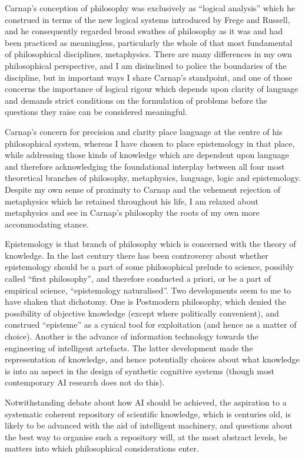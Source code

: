 \documentclass[10pt,titlepage]{book}
\begin{document}
Carnap’s conception of philosophy was exclusively as ``logical analysis'' which he construed in terms of the new logical systems introduced by Frege and Russell, and he consequently regarded broad swathes of philosophy as it was and had been practiced as meaningless, particularly the whole of that most fundamental of philosophical disciplines, metaphysics. There are many differences in my own philosophical perspective, and I am disinclined to police the boundaries of the discipline, but in important ways I share Carnap’s standpoint, and one of those concerns the importance of logical rigour which depends upon clarity of language and demands strict conditions on the formulation of problems before the questions they raise can be considered meaningful.

Carnap’s concern for precision and clarity place language at the centre of his philosophical system, whereas I have chosen to place epistemology in that place, while addressing those kinds of knowledge which are dependent upon language and therefore acknowledging the foundational interplay between all four most theoretical branches of philosophy, metaphysics, language, logic and epistemology. Despite my own sense of proximity to Carnap and the vehement rejection of metaphysics which he retained throughout his life, I am relaxed about metaphysics and see in Carnap’s philosophy the roots of my own more accommodating stance.

Epistemology is that branch of philosophy which is concerned with the theory of knowledge.
In the last century there has been controversy about whether epistemology should be a part of some philosophical prelude to science, possibly called “first philosophy”, and therefore conducted a priori, or be a part of empirical science, “epistemology naturalised”.   Two developments seem to me to have shaken that dichotomy.   One is Postmodern philosophy, which denied the possibility of objective knowledge (except where politically convenient), and construed “episteme” as a cynical tool for exploitation (and hence as a matter of choice).  Another is the advance of information technology towards the engineering of intelligent artefacts.  The latter development made the representation of knowledge, and hence potentially choices about what knowledge is into an aspect in the design of synthetic cognitive systems (though most contemporary AI research does not do this).

Notwithstanding debate about how AI should be achieved, the aspiration to a systematic coherent repository of scientific knowledge, which is centuries old, is likely to be advanced with the aid of intelligent machinery, and questions about the best way to organise such a repository will, at the most abstract levels, be matters into which philosophical considerations enter.
\end{document}
